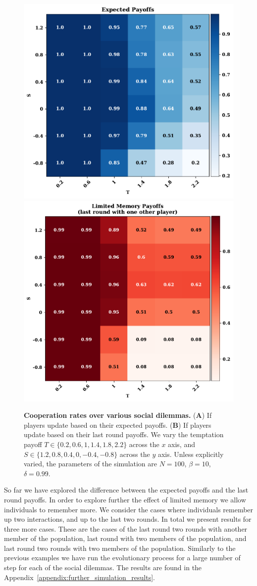 \documentclass[11pt]{article}
\theoremstyle{plainCl1}
\theoremstyle{plainCl2}
\begin{document}
\begin{figure}[!htbp]
  \centering
  \includegraphics[width=.4\textwidth]{static/expected_two_by_two_games_cooperation.pdf}
  \includegraphics[width=.4\textwidth]{static/stochastic_two_by_two_games_cooperation.pdf}
  \caption{\textbf{Cooperation rates over various social dilemmas.} ({\bf A}) If
  players update based on their expected payoffs. ({\bf B}) If
  players update based on their last round payoffs. We vary the temptation
  payoff \(T \in \{0.2, 0.6, 1, 1.4, 1.8, 2.2\}\)
  across the \(x\) axis, and \(S \in \{1.2, 0.8, 0.4, 0, -0.4, -0.8\}\)
  across the \(y\) axis. Unless explicitly varied, the parameters of the simulation
  are $N\!=\!100$, $\beta\!=\!10$, $\delta\!=\!0.99$.}\label{fig:cooperation_rates_two_by_two_part_one}
\end{figure}

So far we have explored the difference between the expected payoffs and the last
round payoffs. In order to explore further the effect of limited memory we allow
individuals to remember more. We consider the cases where individuals remember
up two interactions, and up to the last two rounds. In total we present results
for three more cases. These are the cases of the last round two rounds with
another member of the population, last round with two members of the population,
and last round two rounds with two members of the population. Similarly to the
previous examples we have run the evolutionary process for a large number of
step for each of the social dilemmas. The results are found in the
Appendix~\ref{appendix:further_simulation_results}.
\end{document}
